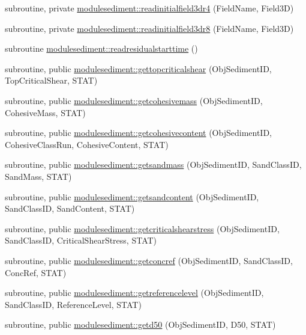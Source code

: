 \begin{DoxyCompactItemize}
\item 
subroutine, private \mbox{\hyperlink{namespacemodulesediment_a3b0c5a0377f0ab98b49b4e9d86627278}{modulesediment\+::readinitialfield3dr4}} (Field\+Name, Field3D)
\item 
subroutine, private \mbox{\hyperlink{namespacemodulesediment_a546771f8f141f33b0a8d1aa803131737}{modulesediment\+::readinitialfield3dr8}} (Field\+Name, Field3D)
\item 
subroutine \mbox{\hyperlink{namespacemodulesediment_a6afc209e64c494c64bdded6011c28e6e}{modulesediment\+::readresidualstarttime}} ()
\item 
subroutine, public \mbox{\hyperlink{namespacemodulesediment_ac51110b9c285467a4e284c185a4a98b1}{modulesediment\+::gettopcriticalshear}} (Obj\+Sediment\+ID, Top\+Critical\+Shear, S\+T\+AT)
\item 
subroutine, public \mbox{\hyperlink{namespacemodulesediment_ae44dda471948f0f9a9a2e1c32fd50738}{modulesediment\+::getcohesivemass}} (Obj\+Sediment\+ID, Cohesive\+Mass, S\+T\+AT)
\item 
subroutine, public \mbox{\hyperlink{namespacemodulesediment_a595e3a876982089ba4949f113b1a0580}{modulesediment\+::getcohesivecontent}} (Obj\+Sediment\+ID, Cohesive\+Class\+Run, Cohesive\+Content, S\+T\+AT)
\item 
subroutine, public \mbox{\hyperlink{namespacemodulesediment_a7bb4238fb2af1033061fd9f1fdf674dc}{modulesediment\+::getsandmass}} (Obj\+Sediment\+ID, Sand\+Class\+ID, Sand\+Mass, S\+T\+AT)
\item 
subroutine, public \mbox{\hyperlink{namespacemodulesediment_ab155d890675462bce376e88c657ed0bb}{modulesediment\+::getsandcontent}} (Obj\+Sediment\+ID, Sand\+Class\+ID, Sand\+Content, S\+T\+AT)
\item 
subroutine, public \mbox{\hyperlink{namespacemodulesediment_a8d9dd5db543a7e0c9baac18bef6dffcf}{modulesediment\+::getcriticalshearstress}} (Obj\+Sediment\+ID, Sand\+Class\+ID, Critical\+Shear\+Stress, S\+T\+AT)
\item 
subroutine, public \mbox{\hyperlink{namespacemodulesediment_a1ace217828c80197497b60fcaad2f95b}{modulesediment\+::getconcref}} (Obj\+Sediment\+ID, Sand\+Class\+ID, Conc\+Ref, S\+T\+AT)
\item 
subroutine, public \mbox{\hyperlink{namespacemodulesediment_ad8d5d321d848d9df2cc84a9c53bc5ec1}{modulesediment\+::getreferencelevel}} (Obj\+Sediment\+ID, Sand\+Class\+ID, Reference\+Level, S\+T\+AT)
\item 
subroutine, public \mbox{\hyperlink{namespacemodulesediment_aa0d71895956b87280c4aa42094f08fdd}{modulesediment\+::getd50}} (Obj\+Sediment\+ID, D50, S\+T\+AT)

\end{DoxyCompactItemize}
